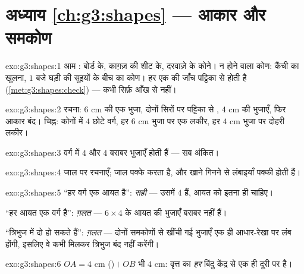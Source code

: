 \section*{अध्याय \ref{ch:g3:shapes} --- आकार और समकोण}

\begin{solution}{exo:g3:shapes:1}
आम : बोर्ड के, काग़ज़ की शीट के, दरवाज़े के कोने।  न
होने वाला कोण: कैंची का खुलना, $1$ बजे घड़ी की सुइयों के बीच का
कोण। हर एक की जाँच  पट्टिका से होती है
(\cref{met:g3:shapes:check}) --- कभी सिर्फ़ आँख से नहीं।
\end{solution}

\begin{solution}{exo:g3:shapes:2}
रचना: $6$ cm की एक भुजा, दोनों सिरों पर  पट्टिका से
, $4$ cm की भुजाएँ, फिर आकार बंद। चिह्न: कोनों में $4$
छोटे वर्ग, हर $6$ cm भुजा पर एक लकीर, हर $4$ cm भुजा पर दोहरी
लकीर।
\end{solution}

\begin{solution}{exo:g3:shapes:3}
वर्ग में $4$  और $4$ बराबर भुजाएँ होती हैं --- सब अंकित।
\end{solution}

\begin{solution}{exo:g3:shapes:4}
जाल पर रचनाएँ; जाल  पक्के करता है, और खाने गिनने से
लंबाइयाँ पक्की होती हैं।
\end{solution}

\begin{solution}{exo:g3:shapes:5}
``हर वर्ग एक आयत है'': \emph{सही} --- उसमें $4$ 
हैं, आयत को इतना ही चाहिए।

``हर आयत एक वर्ग है'': \emph{ग़लत} --- $6 \times 4$ के
आयत की भुजाएँ बराबर नहीं हैं।

``त्रिभुज में दो  हो सकते हैं'': \emph{ग़लत} --- दोनों
समकोणों से खींची गई भुजाएँ एक ही आधार-रेखा पर लंब होंगी,
इसलिए वे कभी मिलकर त्रिभुज बंद नहीं करेंगी।
\end{solution}

\begin{solution}{exo:g3:shapes:6}
$OA = 4$ cm ()। $OB$ भी $4$ cm: वृत्त का \emph{हर}
बिंदु केंद्र से एक ही दूरी पर है।
\end{solution}

